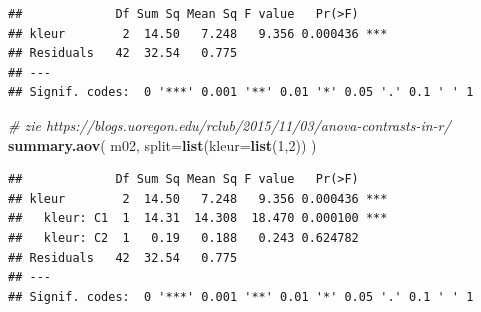 \documentclass[
]{book}
\newenvironment{Shaded}{\begin{snugshade}}{\end{snugshade}}
\newcommand{\CommentTok}[1]{\textcolor[rgb]{0.56,0.35,0.01}{\textit{#1}}}
\newcommand{\DataTypeTok}[1]{\textcolor[rgb]{0.13,0.29,0.53}{#1}}
\newcommand{\DecValTok}[1]{\textcolor[rgb]{0.00,0.00,0.81}{#1}}
\newcommand{\KeywordTok}[1]{\textcolor[rgb]{0.13,0.29,0.53}{\textbf{#1}}}
\newcommand{\NormalTok}[1]{#1}
\newcommand{\OperatorTok}[1]{\textcolor[rgb]{0.81,0.36,0.00}{\textbf{#1}}}
\newcommand{\StringTok}[1]{\textcolor[rgb]{0.31,0.60,0.02}{#1}}
\begin{document}
\begin{Shaded}
\end{Shaded}

\begin{verbatim}
##             Df Sum Sq Mean Sq F value   Pr(>F)    
## kleur        2  14.50   7.248   9.356 0.000436 ***
## Residuals   42  32.54   0.775                     
## ---
## Signif. codes:  0 '***' 0.001 '**' 0.01 '*' 0.05 '.' 0.1 ' ' 1
\end{verbatim}

\begin{Shaded}
\begin{Highlighting}[]
\CommentTok{\# zie https://blogs.uoregon.edu/rclub/2015/11/03/anova{-}contrasts{-}in{-}r/}
\KeywordTok{summary.aov}\NormalTok{( m02, }\DataTypeTok{split=}\KeywordTok{list}\NormalTok{(}\DataTypeTok{kleur=}\KeywordTok{list}\NormalTok{(}\DecValTok{1}\NormalTok{,}\DecValTok{2}\NormalTok{)) )}
\end{Highlighting}
\end{Shaded}

\begin{verbatim}
##             Df Sum Sq Mean Sq F value   Pr(>F)    
## kleur        2  14.50   7.248   9.356 0.000436 ***
##   kleur: C1  1  14.31  14.308  18.470 0.000100 ***
##   kleur: C2  1   0.19   0.188   0.243 0.624782    
## Residuals   42  32.54   0.775                     
## ---
## Signif. codes:  0 '***' 0.001 '**' 0.01 '*' 0.05 '.' 0.1 ' ' 1
\end{verbatim}
\end{document}
